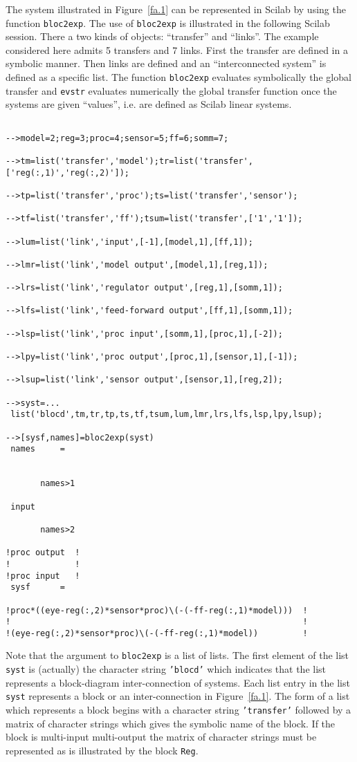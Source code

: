 	The system illustrated in Figure~\ref{fa.1} can
be represented in Scilab by using the function {\tt bloc2exp}.
The use of {\tt bloc2exp} is illustrated in the following Scilab
session.
There a two kinds of objects: ``transfer'' and ``links''. The example
considered here admits 5 transfers and 7 links.
First the transfer are defined in a symbolic manner. Then links
are defined and an ``interconnected system'' is defined as
a specific list. The function {\tt bloc2exp} evaluates symbolically
the global transfer and {\tt evstr} evaluates numerically
the global transfer function once the systems are given ``values'', i.e.
are defined as Scilab linear systems.
%
\begin{verbatim}
 
-->model=2;reg=3;proc=4;sensor=5;ff=6;somm=7;
 
-->tm=list('transfer','model');tr=list('transfer',['reg(:,1)','reg(:,2)']);
 
-->tp=list('transfer','proc');ts=list('transfer','sensor');
 
-->tf=list('transfer','ff');tsum=list('transfer',['1','1']);
 
-->lum=list('link','input',[-1],[model,1],[ff,1]);
 
-->lmr=list('link','model output',[model,1],[reg,1]);
 
-->lrs=list('link','regulator output',[reg,1],[somm,1]);
 
-->lfs=list('link','feed-forward output',[ff,1],[somm,1]);
 
-->lsp=list('link','proc input',[somm,1],[proc,1],[-2]);
 
-->lpy=list('link','proc output',[proc,1],[sensor,1],[-1]);
 
-->lsup=list('link','sensor output',[sensor,1],[reg,2]);
 
-->syst=...
 list('blocd',tm,tr,tp,ts,tf,tsum,lum,lmr,lrs,lfs,lsp,lpy,lsup);
 
-->[sysf,names]=bloc2exp(syst)
 names     =
 
 
       names>1
 
 input   
 
       names>2
 
!proc output  !
!             !
!proc input   !
 sysf      =
 
!proc*((eye-reg(:,2)*sensor*proc)\(-(-ff-reg(:,1)*model)))  !
!                                                           !
!(eye-reg(:,2)*sensor*proc)\(-(-ff-reg(:,1)*model))         !
\end{verbatim}
%
Note that the argument to {\tt bloc2exp} is a list of lists.  The 
first element of the list {\tt syst} is (actually) the character string
{\tt 'blocd'} which indicates that the list represents a block-diagram
inter-connection of systems.  Each list entry in the list {\tt syst}
represents a block or an inter-connection in Figure~\ref{fa.1}.
The form of a list which represents a block begins with a character
string {\tt 'transfer'} followed by a matrix of character strings
which gives the symbolic name of the block.  If the block is multi-input
multi-output the matrix of character strings must be represented as
is illustrated by the block {\tt Reg}.  

